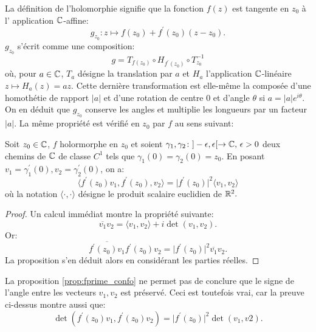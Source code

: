 La définition de l'holomorphie signifie que la fonction $f(z)$ est tangente en $z_0$ à l' application $\mathbb{C}$-affine:
\begin{equation}
  \label{eq:app_c_tangente}
  g_{z_0} \colon z \mapsto f(z_0) + f^\prime(z_0)(z-z_0).
\end{equation} 
$g_{z_0}$ s'écrit comme une composition:
\begin{equation}
  g = T_{f(z_0)}\circ H_{f^\prime(z_0)} \circ T_{z_0}^{-1}
\end{equation} 
où, pour $a \in \mathbb{C}$,  $T_a$ désigne la translation par $a$ et $H_a$ l'application $\mathbb{C}$-linéaire $z \mapsto H_a(z) = az.$ Cette dernière 
transformation est elle-même la composée d'une homothétie de rapport $\lvert a \rvert$ et d'une rotation de centre $0$ et d'angle $\theta$ 
si $a=\lvert a \rvert e^{i \theta} .$ 
On en déduit que $g_{z_0}$ conserve les angles et multiplie les longueurs par un facteur $\lvert a \rvert.$
La même propriété est vérifié en $z_0$ par $f$ au sens suivant:
\begin{fprop}
  \label{prop:fprime_confo}
Soit $z_0 \in \mathbb{C}$, $f$ holormorphe en $z_0$ et soient $\gamma_1, \gamma_2 \colon ]-\epsilon, \epsilon [  \to \mathbb{C}, \, \epsilon > 0$ deux chemins de $\mathbb{C}$
de classe $C^1$ tels que $\gamma_1(0) = \gamma_2(0) = z_0.$ En posant $v_1= \gamma_1^\prime(0), v_2 = \gamma_2^\prime(0)$, on a: 
\begin{equation}
  \langle f^\prime(z_0) v_1, f^\prime(z_0),v_2 \rangle = \lvert f^\prime(z_0) \rvert^2 \langle v_1, v_2 \rangle
\end{equation}
où la notation $\langle \cdot, \cdot \rangle$ désigne le produit scalaire euclidien de $\mathbb R^2.$
\end{fprop}
\begin{proof}
  Un calcul immédiat montre la propriété suivante:
  \begin{equation}
    \overline{v_1}v_2 = \langle v_1, v_2 \rangle + i \det \left( v_1, v_2 \right).
  \end{equation}
  Or:
  \begin{equation}
    \overline{f^\prime(z_0)v_1}f^\prime(z_0)v_2 = \lvert f^\prime(z_0) \rvert^2 \overline{v_1}v_2.
  \end{equation}
  La proposition s'en déduit alors en considérant les parties réelles.
\end{proof}
\begin{rem}
La proposition \ref{prop:fprime_confo} ne permet pas de conclure que le signe de l'angle entre les vecteurs $v_1,v_2$ est préservé. Ceci 
est toutefois vrai, car la preuve ci-dessus montre aussi que:
\begin{equation}
  \det\left( f^\prime(z_0)v_1,f^\prime(z_0)v_2 \right) = \lvert f^\prime(z_0) \rvert^2 \det\left( v_1,v2 \right).
\end{equation}
\end{rem}

